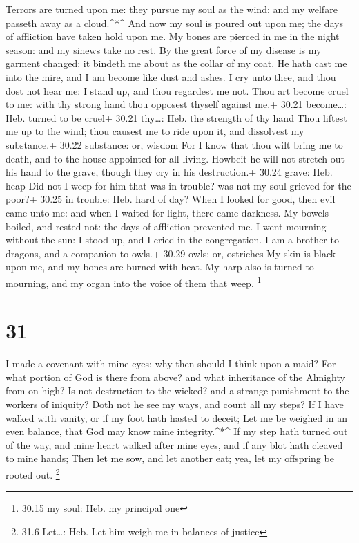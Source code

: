  Terrors are turned upon me: they pursue my soul as the
wind: and my welfare passeth away as a cloud.\^{}*\^{}  And
now my soul is poured out upon me; the days of affliction have taken
hold upon me.  My bones are pierced in me in the night
season: and my sinews take no rest.  By the great force of
my disease is my garment changed: it bindeth me about as the collar of
my coat.  He hath cast me into the mire, and I am become
like dust and ashes.  I cry unto thee, and thou dost not
hear me: I stand up, and thou regardest me not.  Thou art
become cruel to me: with thy strong hand thou opposest thyself against
me.+ 30.21 become\ldots: Heb. turned to be cruel+ 30.21 thy\ldots: Heb.
the strength of thy hand  Thou liftest me up to the wind;
thou causest me to ride upon it, and dissolvest my substance.+ 30.22
substance: or, wisdom  For I know that thou wilt bring me
to death, and to the house appointed for all living. 
Howbeit he will not stretch out his hand to the grave, though they cry
in his destruction.+ 30.24 grave: Heb. heap  Did not I weep
for him that was in trouble? was not my soul grieved for the poor?+
30.25 in trouble: Heb. hard of day?  When I looked for
good, then evil came unto me: and when I waited for light, there came
darkness.  My bowels boiled, and rested not: the days of
affliction prevented me.  I went mourning without the sun:
I stood up, and I cried in the congregation.  I am a
brother to dragons, and a companion to owls.+ 30.29 owls: or, ostriches
 My skin is black upon me, and my bones are burned with
heat.  My harp also is turned to mourning, and my organ
into the voice of them that weep. \footnote{30.15 my soul: Heb. my
  principal one}

\hypertarget{section-30}{%
\section{31}\label{section-30}}

 I made a covenant with mine eyes; why then should I think
upon a maid?  For what portion of God is there from above?
and what inheritance of the Almighty from on high?  Is not
destruction to the wicked? and a strange punishment to the workers of
iniquity?  Doth not he see my ways, and count all my steps?
 If I have walked with vanity, or if my foot hath hasted to
deceit;  Let me be weighed in an even balance, that God may
know mine integrity.\^{}*\^{}  If my step hath turned out of
the way, and mine heart walked after mine eyes, and if any blot hath
cleaved to mine hands;  Then let me sow, and let another
eat; yea, let my offspring be rooted out. \footnote{31.6 Let\ldots: Heb.
  Let him weigh me in balances of justice}

